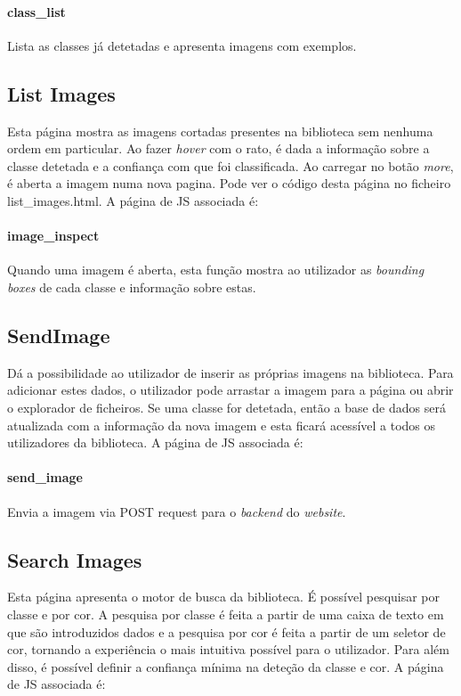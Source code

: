 \documentclass{report}
\begin{document}
\paragraph{class\_list} 
Lista as classes já detetadas e apresenta imagens com exemplos.

\subsection{List Images}
Esta página mostra as imagens cortadas presentes na biblioteca sem nenhuma ordem em particular. Ao fazer 
\textit{hover} com o rato, é dada a informação sobre a classe detetada e a confiança com que foi classificada.
Ao carregar no botão \textit{more}, é aberta a imagem numa nova pagina. 
Pode ver o código desta página no ficheiro list\_images.html. A página de JS associada é:
\paragraph{image\_inspect}
Quando uma imagem é aberta, esta função mostra ao utilizador as \textit{bounding boxes} de cada classe e informação sobre estas. 

\subsection{SendImage}
Dá a possibilidade ao utilizador de inserir as próprias imagens na biblioteca. Para adicionar estes dados, o utilizador pode arrastar a imagem para a página ou abrir o explorador de ficheiros. Se uma classe for detetada, então a base de dados será atualizada com a informação da nova imagem e esta ficará acessível a todos os utilizadores da biblioteca. A página de JS associada é:
\paragraph{send\_image}
Envia a imagem via POST request para o \textit{backend} do \textit{website}. 

\subsection{Search Images}
Esta página apresenta o motor de busca da biblioteca. É possível pesquisar por classe e por cor. 
A pesquisa por classe é feita a partir de uma caixa de texto em que são introduzidos dados e 
a pesquisa por cor é feita a partir de um seletor de cor, tornando a experiência o mais intuitiva 
possível para o utilizador. Para além disso, é possível definir a confiança mínima na deteção da classe 
e cor. A página de JS associada é:
\end{document}
